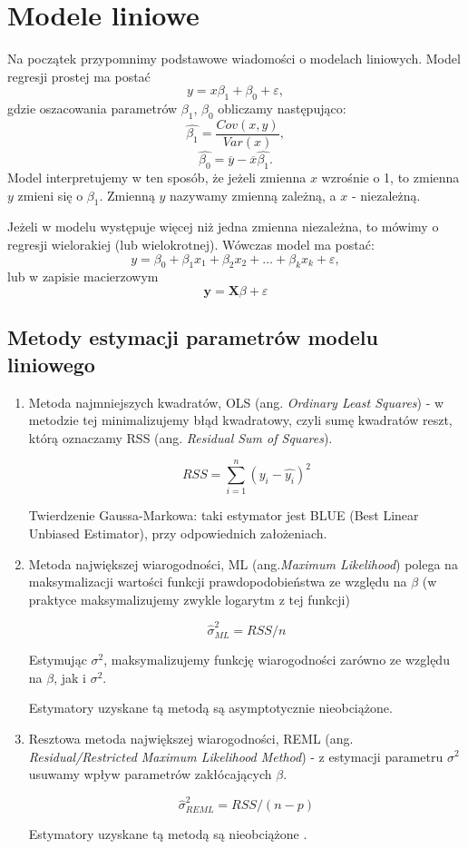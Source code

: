 \documentclass[12pt]{mwbk}
\theoremstyle{plain}
\theoremstyle{definition}
\theoremstyle{remark}
\newcommand{\yy}{\mathbf{y}}
\begin{document}
\section{Modele liniowe}
Na początek przypomnimy podstawowe wiadomości o modelach liniowych. Model regresji prostej ma postać $$y=x \beta_1+\beta_0 + \varepsilon,$$ gdzie oszacowania parametrów $\beta_1$, $\beta_0$ obliczamy następująco:
$$\hat{\beta_1}=\frac{Cov(x,y)}{Var(x)},$$
$$\hat{\beta_0}=\overline{y}-\overline{x}\hat{\beta_1}.$$ Model interpretujemy w ten sposób, że jeżeli zmienna $x$ wzrośnie o 1, to zmienna $y$ zmieni się o $\beta_1$. Zmienną $y$ nazywamy zmienną zależną, a $x$ - niezależną.

Jeżeli w modelu występuje więcej niż jedna zmienna niezależna, to mówimy o regresji wielorakiej (lub wielokrotnej). Wówczas model ma postać: $$y=\beta_0+\beta_1 x_1+\beta_2 x_2 + \ldots + \beta_k x_k + \varepsilon,$$ lub w zapisie macierzowym $$\yy=\mathbf{X}\beta+\varepsilon$$

\begin{center}
\end{center}
\subsection{Metody estymacji parametrów modelu liniowego}
\begin{enumerate}
	\item Metoda najmniejszych kwadratów, OLS (ang. \emph{Ordinary Least Squares}) - w metodzie tej minimalizujemy błąd kwadratowy, czyli sumę kwadratów reszt, którą oznaczamy RSS (ang. \emph{Residual Sum of Squares}).
	
	$$RSS= \sum_{i=1}^{n}(y_i-\hat{y_i})^2$$
	
	Twierdzenie Gaussa-Markowa: taki estymator jest BLUE (Best Linear Unbiased Estimator), przy odpowiednich założeniach.
	
	\item Metoda największej wiarogodności, ML (ang.\textit{Maximum Likelihood}) polega na maksymalizacji wartości funkcji prawdopodobieństwa ze względu na $\beta$ (w praktyce maksymalizujemy zwykle logarytm z tej funkcji)
	
	$$\hat{\sigma}^{2}_{ML}=RSS/n$$
	
	Estymując $\sigma^2$, maksymalizujemy funkcję wiarogodności zarówno ze względu na $\beta$, jak i $\sigma^2$.
	
	Estymatory uzyskane tą metodą są asymptotycznie nieobciążone.
	
	\item Resztowa metoda największej wiarogodności, REML (ang. \textit{Residual/Restricted Maximum Likelihood Method}) - z estymacji parametru $\sigma^2$ usuwamy wpływ parametrów zakłócających $\beta$.
	
	$$\hat{\sigma}^2_{REML}=RSS/(n-p)$$
	
	Estymatory uzyskane tą metodą są nieobciążone \cite{biecek}.
\end{enumerate}
\begin{center}
\end{center}
\end{document}
